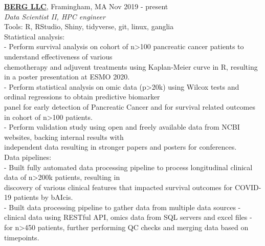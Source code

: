 \documentclass[a4paper]{article}
\newcommand{\mybullet}{
	\indent 
  \textbullet \hspace*{2mm}
}
\newcommand{\mysubbullet}{
	\indent 
  - \hspace*{2mm}
}
\begin{document}
  \noindent
  \textbf{\href{https://www.berghealth.com/}{BERG LLC}}, Framingham, MA 
  \hfill Nov 2019 - present \\
  \textit{Data Scientist II, \hspace*{1mm} HPC engineer} \\
  Tools: R, RStudio, Shiny, tidyverse, git, linux, ganglia \\
  \mybullet Statistical analysis: \\
  \mysubbullet Perform survival analysis on cohort of n>100 pancreatic cancer patients to understand effectiveness of various \\\hspace*{10mm}chemotherapy and adjuvent treatments using Kaplan-Meier curve in R, resulting in a poster presentation at ESMO 2020. \\
  \mysubbullet Perform statistical analysis on omic data (p>20k) using Wilcox tests and ordinal regressions to obtain predictive biomarker \\\hspace*{10mm}panel for early detection of Pancreatic Cancer and for survival related outcomes in cohort of n>100 patients. \\
  \mysubbullet Perform validation study using open and freely available data from NCBI websites, backing internal results with \\\hspace*{10mm}independent data resulting in stronger papers and posters for conferences. \\
  \mybullet Data pipelines: \\
  \mysubbullet Built fully automated data processing pipeline to process longitudinal clinical data of n>200k patients, resulting in \\\hspace*{10mm}discovery of various clinical features that impacted survival outcomes for COVID-19 patients by bAIcis\textregistered. \\
  \mysubbullet Built data processing pipeline to gather data from multiple data sources - clinical data using RESTful API, omics data from \hspace*{10mm}SQL servers and excel files - for n>450 patients, further performing QC checks and merging data based on timepoints. \\
\end{document}
